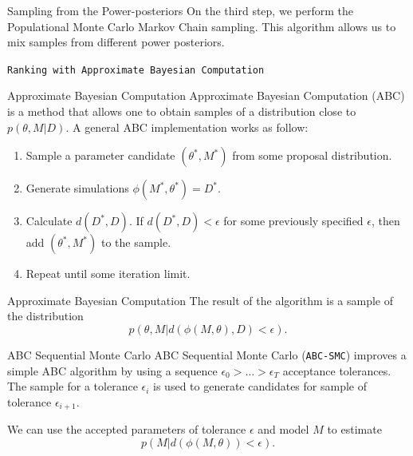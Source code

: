 \documentclass{beamer}
\begin{document}
\begin{frame}{Sampling from the Power-posteriors}
On the third step, we perform the \alert{Populational Monte Carlo Markov
Chain} sampling. This algorithm allows us to mix samples from different 
power posteriors.
\end{frame}


\begin{frame}{}
\begin{center}
    \texttt{Ranking with Approximate Bayesian Computation}
\end{center}
\end{frame}


\begin{frame}{Approximate Bayesian Computation}
Approximate Bayesian Computation (ABC) is a method that allows one to
obtain samples of a distribution close to $p (\theta, M | D)$. \pause
A general ABC implementation works as follow:

\begin{enumerate}
    \pause
    \item{Sample a parameter candidate $(\theta^*, M^*)$ from some 
        proposal distribution.}
    \pause
    \item{Generate simulations $\phi (M^*, \theta^*) = D^*$.}
    \pause
    \item{Calculate $d (D^*, D).$ If $d (D^*, D) < \epsilon$ for some 
        previously specified $\epsilon$, then add $(\theta^*, M^*)$ to 
        the sample.}
    \pause
    \item{Repeat until some iteration limit.}
\end{enumerate}
\end{frame}


\begin{frame}{Approximate Bayesian Computation}
The result of the algorithm is a sample of the distribution 
\begin{equation*}
p (\theta, M| d (\phi (M, \theta), D) < \epsilon).
\end{equation*}

\end{frame}

\begin{frame}{ABC Sequential Monte Carlo}
\alert{ABC Sequential Monte Carlo (\texttt{ABC-SMC})} improves a simple
ABC algorithm by using a sequence $\epsilon_0 > \ldots > \epsilon_T$
    acceptance tolerances. 
\pause The sample for a tolerance $\epsilon_i$ is used to generate 
candidates for sample of tolerance $\epsilon_{i + 1}$.

\pause
We can use the accepted parameters of tolerance $\epsilon$ and model $M$
to estimate 
\begin{equation*}
    p (M | d (\phi (M, \theta)) < \epsilon).
\end{equation*}
\end{frame}
\end{document}
